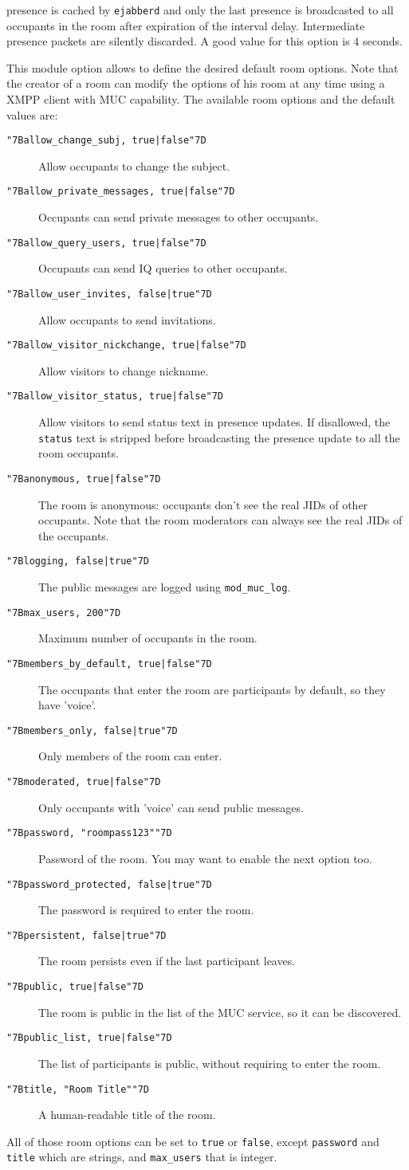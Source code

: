 \documentclass[a4paper,10pt]{book}
\newcommand{\ind}[1]{\begin{latexonly}\index{#1}\end{latexonly}}
\newcommand{\bracehack}{\def\{{\char"7B}\def\}{\char"7D}}
\newcommand{\titem}[1]{\item[\bracehack\texttt{#1}]}
\newcommand{\term}[1]{\texttt{#1}}
\newcommand{\ejabberd}{\texttt{ejabberd}}
\begin{document}
\begin{description}
  presence is cached by \ejabberd{} and only the last presence is
  broadcasted to all occupants in the room after expiration of the
  interval delay. Intermediate presence packets are silently
  discarded. A good value for this option is 4 seconds.
\titem{\{default\_room\_options, [ \{OptionName, OptionValue\}, ...]\}} \ind{options!default\_room\_options}
  This module option allows to define the desired default room options.
  Note that the creator of a room can modify the options of his room
  at any time using a XMPP client with MUC capability.
  The available room options and the default values are:
  \begin{description}
  \titem{\{allow\_change\_subj, true|false\}} Allow occupants to change the subject.
  \titem{\{allow\_private\_messages, true|false\}} Occupants can send private messages to other occupants.
  \titem{\{allow\_query\_users, true|false\}} Occupants can send IQ queries to other occupants.
  \titem{\{allow\_user\_invites, false|true\}} Allow occupants to send invitations.
  \titem{\{allow\_visitor\_nickchange, true|false\}} Allow visitors to
  change nickname.
  \titem{\{allow\_visitor\_status, true|false\}} Allow visitors to send
  status text in presence updates.  If disallowed, the \term{status}
  text is stripped before broadcasting the presence update to all
  the room occupants.
  \titem{\{anonymous, true|false\}} The room is anonymous:
  occupants don't see the real JIDs of other occupants.
  Note that the room moderators can always see the real JIDs of the occupants.
  \titem{\{logging, false|true\}} The public messages are logged using \term{mod\_muc\_log}.
  \titem{\{max\_users, 200\}} Maximum number of occupants in the room.
  \titem{\{members\_by\_default, true|false\}} The occupants that enter the room are participants by default, so they have 'voice'.
  \titem{\{members\_only, false|true\}} Only members of the room can enter.
  \titem{\{moderated, true|false\}} Only occupants with 'voice' can send public messages.
  \titem{\{password, "roompass123"\}} Password of the room. You may want to enable the next option too.
  \titem{\{password\_protected, false|true\}} The password is required to enter the room.
  \titem{\{persistent, false|true\}} The room persists even if the last participant leaves.
  \titem{\{public, true|false\}} The room is public in the list of the MUC service, so it can be discovered.
  \titem{\{public\_list, true|false\}} The list of participants is public, without requiring to enter the room.
  \titem{\{title, "Room Title"\}} A human-readable title of the room.
  \end{description}
  All of those room options can be set to \term{true} or \term{false},
  except \term{password} and \term{title} which are strings,
  and \term{max\_users} that is integer.
\end{description}
\end{document}
